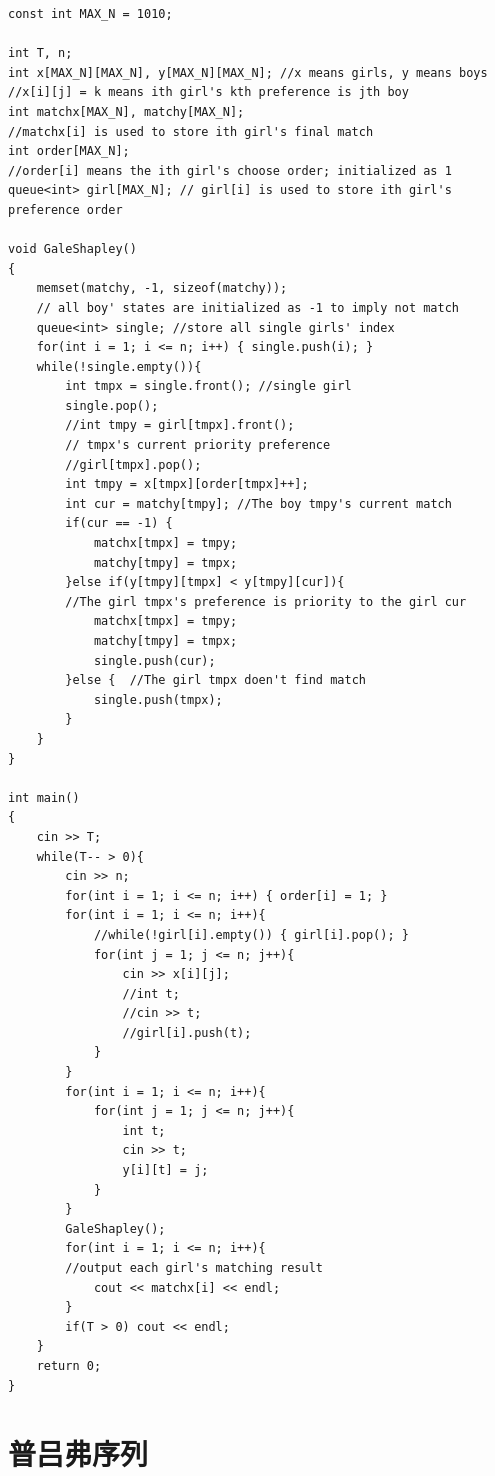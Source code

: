 \begin{lstlisting}
const int MAX_N = 1010;

int T, n;
int x[MAX_N][MAX_N], y[MAX_N][MAX_N]; //x means girls, y means boys
//x[i][j] = k means ith girl's kth preference is jth boy
int matchx[MAX_N], matchy[MAX_N];
//matchx[i] is used to store ith girl's final match
int order[MAX_N];
//order[i] means the ith girl's choose order; initialized as 1
queue<int> girl[MAX_N]; // girl[i] is used to store ith girl's preference order

void GaleShapley()
{
    memset(matchy, -1, sizeof(matchy));
    // all boy' states are initialized as -1 to imply not match
    queue<int> single; //store all single girls' index
    for(int i = 1; i <= n; i++) { single.push(i); }
    while(!single.empty()){
        int tmpx = single.front(); //single girl
        single.pop();
        //int tmpy = girl[tmpx].front();
        // tmpx's current priority preference
        //girl[tmpx].pop();
        int tmpy = x[tmpx][order[tmpx]++];
        int cur = matchy[tmpy]; //The boy tmpy's current match
        if(cur == -1) {
            matchx[tmpx] = tmpy;
            matchy[tmpy] = tmpx;
        }else if(y[tmpy][tmpx] < y[tmpy][cur]){
        //The girl tmpx's preference is priority to the girl cur
            matchx[tmpx] = tmpy;
            matchy[tmpy] = tmpx;
            single.push(cur);
        }else {  //The girl tmpx doen't find match
            single.push(tmpx);
        }
    }
}

int main()
{
    cin >> T;
    while(T-- > 0){
        cin >> n;
        for(int i = 1; i <= n; i++) { order[i] = 1; }
        for(int i = 1; i <= n; i++){
            //while(!girl[i].empty()) { girl[i].pop(); }
            for(int j = 1; j <= n; j++){
                cin >> x[i][j];
                //int t;
                //cin >> t;
                //girl[i].push(t);
            }
        }
        for(int i = 1; i <= n; i++){
            for(int j = 1; j <= n; j++){
                int t;
                cin >> t;
                y[i][t] = j;
            }
        }
        GaleShapley();
        for(int i = 1; i <= n; i++){
        //output each girl's matching result
            cout << matchx[i] << endl;
        }
        if(T > 0) cout << endl;
    }
    return 0;
}
\end{lstlisting}
\section{普吕弗序列}

